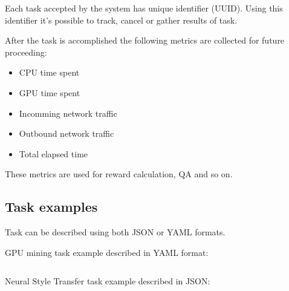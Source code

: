 Each task accepted by the system has unique identifier (UUID)\cite{uuid}.
Using this identifier it's possible to track, cancel or gather results of task.

After the task is accomplished the following metrics are collected for future proceeding:

\begin{itemize}
    \item CPU time spent
    \item GPU time spent
    \item Incomming network traffic
    \item Outbound network traffic
    \item Total elapsed time
\end{itemize}

These metrics are used for reward calculation, QA and so on.

\subsection{Task examples}

Task can be described using both JSON or YAML formats.

GPU mining task example described in YAML format:

\inputminted{yaml}{claymore-cuda-mining-task.yaml}

\newpage
Neural Style Transfer task example described in JSON:

\inputminted{json}{neural-style-task.json}

